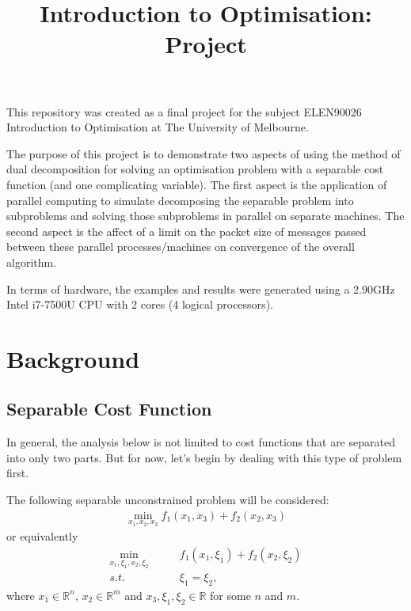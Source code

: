 \documentclass[12pt]{article}
\begin{document}
\title{Introduction to Optimisation: Project}
\author{}
\date{}
\maketitle

This repository was created as a final project for the subject ELEN90026 Introduction to Optimisation at The University of Melbourne.

The purpose of this project is to demonstrate two aspects of using the method of dual decomposition for solving an optimisation problem with a separable cost function (and one complicating variable). The first aspect is the application of parallel computing to simulate decomposing the separable problem into subproblems and solving those subproblems in parallel on separate machines. The second aspect is the affect of a limit on the packet size of messages passed between these parallel processes/machines on convergence of the overall algorithm.

In terms of hardware, the examples and results were generated using a 2.90GHz Intel i7-7500U CPU with 2 cores (4 logical processors).

\section*{Background}

\subsection*{Separable Cost Function}
In general, the analysis below is not limited to cost functions that are separated into only two parts. But for now, let's begin by dealing with this type of problem first.

The following separable unconstrained problem will be considered:
\begin{align*}
\min_{x_1,x_2,x_3}f_1(x_1,x_3)+f_2(x_2,x_3)
\end{align*}
or equivalently
\begin{align*}
\min_{x_1,\xi_1,x_2,\xi_2}\qquad&f_1(x_1,\xi_1)+f_2(x_2,\xi_2)\\
s.t.\qquad&\xi_1=\xi_2,
\end{align*}
where $x_1\in\mathbb{R}^n$, $x_2\in\mathbb{R}^m$ and $x_3,\xi_1,\xi_2\in\mathbb{R}$ for some $n$ and $m$.
\end{document}
